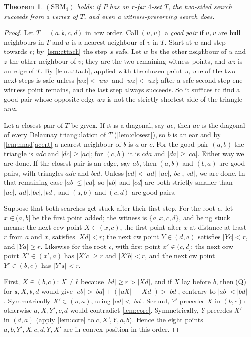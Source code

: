 \documentclass[11pt,a4paper]{article}
\newtheorem{theorem}{Theorem}
\theoremstyle{definition}
\theoremstyle{remark}
\begin{document}
\begin{theorem}\label{thm:sbm4}
$(\mathrm{SBM}_4)$ holds: if $P$ has an $r$-far $4$-set $T$, the two-sided
search succeeds from a vertex of $T$, and even a witness-preserving search does.
\end{theorem}
\begin{proof}
Let $T=(a,b,c,d)$ in ccw order. Call $(u,v)$ a \emph{good pair} if $u,v$ are
hull neighbours in $T$ and $u$ is a nearest neighbour of $v$ in $T$. Start at
$u$ and step towards $v$; by \cref{lem:attach} the step is safe. Let $w$ be
the other neighbour of $u$ and $z$ the other neighbour of $v$; they are the
two remaining witness points, and $wz$ is an edge of $T$. By \cref{lem:attach},
applied with the chosen point $u$, one of the two next steps is safe unless $|wz|<|uw|$ and
$|wz|<|uz|$; after a safe second step one witness point remains, and the last
step always succeeds. So it suffices to find a good pair whose opposite edge
$wz$ is not the strictly shortest side of the triangle $uwz$.

Let a closest pair of $T$ be given. If it is a diagonal, say $ac$, then $ac$
is the diagonal of every Delaunay triangulation of $T$ (\cref{lem:closest}),
so $b$ is an ear and by \cref{lem:nnadjacent} a nearest neighbour of $b$ is
$a$ or $c$. For the good pair $(a,b)$ the triangle is $adc$ and $|dc|\ge|ac|$;
for $(c,b)$ it is $cda$ and $|da|\ge|ca|$. Either way we are done. If the
closest pair is an edge, say $ab$, then $(a,b)$ and $(b,a)$ are good pairs,
with triangles $adc$ and $bcd$. Unless $|cd|<|ad|,|ac|,|bc|,|bd|$, we are done.
In that remaining case $|ab|\le|cd|$, so $|ab|$ and $|cd|$ are both strictly
smaller than $|ac|,|ad|,|bc|,|bd|$, and $(a,b)$ and $(c,d)$ are good pairs.

Suppose that both searches get stuck after their first step. For the root
$a$, let $x\in(a,b]$ be the first point added; the witness is
$\{a,x,c,d\}$, and being stuck means: the next ccw point $X\in(x,c)$, the
first point after $x$ at distance at least $r$ from $a$ and $x$, satisfies
$|Xd|<r$; the next cw point $Y\in(d,a)$ satisfies $|Yc|<r$, and $|Ya|\ge r$.
Likewise for the root $c$, with first point $x'\in(c,d]$: the next ccw point
$X'\in(x',a)$ has $|X'c|\ge r$ and $|X'b|<r$, and the next cw point
$Y'\in(b,c)$ has $|Y'a|<r$.

First, $X\in(b,c)$: $X\ne b$ because $|bd|\ge r>|Xd|$, and if $X$ lay before
$b$, then (Q) for $a,X,b,d$ would give $|ab|>|bd|+(|aX|-|Xd|)>|bd|$, contrary
to $|ab|<|bd|$. Symmetrically $X'\in(d,a)$, using $|cd|<|bd|$. Second, $Y'$
precedes $X$ in $(b,c)$: otherwise $a,X,Y',c,d$ would contradict
\cref{lem:core}. Symmetrically, $Y$ precedes $X'$ in $(d,a)$ (apply
\cref{lem:core} to $c,X',Y,a,b$). Hence the eight points
$a,b,Y',X,c,d,Y,X'$ are in convex position in this order.


\end{proof}
\end{document}

